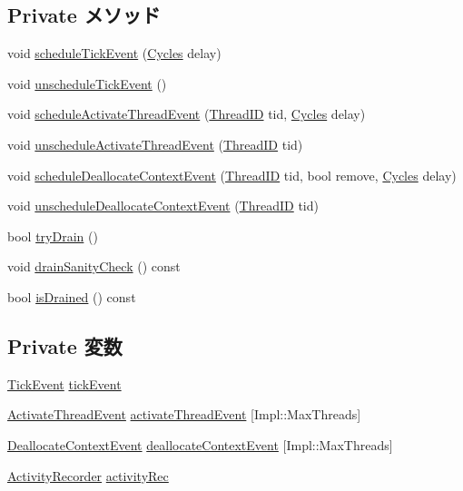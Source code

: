\subsection*{Private メソッド}
\begin{DoxyCompactItemize}
\item 
void \hyperlink{classFullO3CPU_a71eb9ea7b25032de341033111b946dfc}{scheduleTickEvent} (\hyperlink{classCycles}{Cycles} delay)
\item 
void \hyperlink{classFullO3CPU_ad819e7898bd94721d107a35fde764390}{unscheduleTickEvent} ()
\item 
void \hyperlink{classFullO3CPU_a20e502f38206c8cd988064e7bed53bb5}{scheduleActivateThreadEvent} (\hyperlink{base_2types_8hh_ab39b1a4f9dad884694c7a74ed69e6a6b}{ThreadID} tid, \hyperlink{classCycles}{Cycles} delay)
\item 
void \hyperlink{classFullO3CPU_ae0bacbe9552a4b3a03f2748d2d58b3a2}{unscheduleActivateThreadEvent} (\hyperlink{base_2types_8hh_ab39b1a4f9dad884694c7a74ed69e6a6b}{ThreadID} tid)
\item 
void \hyperlink{classFullO3CPU_a8c575b3dcfc822888003b64457ac9755}{scheduleDeallocateContextEvent} (\hyperlink{base_2types_8hh_ab39b1a4f9dad884694c7a74ed69e6a6b}{ThreadID} tid, bool remove, \hyperlink{classCycles}{Cycles} delay)
\item 
void \hyperlink{classFullO3CPU_adce69706fd17d1dca824e60ab0100e8b}{unscheduleDeallocateContextEvent} (\hyperlink{base_2types_8hh_ab39b1a4f9dad884694c7a74ed69e6a6b}{ThreadID} tid)
\item 
bool \hyperlink{classFullO3CPU_a250ca18dfc0316e340eaa2ec45d73c3e}{tryDrain} ()
\item 
void \hyperlink{classFullO3CPU_a0240eb42fa57fe5d3788093f62b77347}{drainSanityCheck} () const 
\item 
bool \hyperlink{classFullO3CPU_adf5473c18a3d7c1e88c4a2072bce5526}{isDrained} () const 
\end{DoxyCompactItemize}
\subsection*{Private 変数}
\begin{DoxyCompactItemize}
\item 
\hyperlink{classFullO3CPU_1_1TickEvent}{TickEvent} \hyperlink{classFullO3CPU_aa36b8e894416f0ec98f701ab08f2ac22}{tickEvent}
\item 
\hyperlink{classFullO3CPU_1_1ActivateThreadEvent}{ActivateThreadEvent} \hyperlink{classFullO3CPU_a2cc2815b59781367286d6a31fc45e9d3}{activateThreadEvent} \mbox{[}Impl::MaxThreads\mbox{]}
\item 
\hyperlink{classFullO3CPU_1_1DeallocateContextEvent}{DeallocateContextEvent} \hyperlink{classFullO3CPU_aaf8ffd47de062d6900cb500a3caccdb5}{deallocateContextEvent} \mbox{[}Impl::MaxThreads\mbox{]}
\item 
\hyperlink{classActivityRecorder}{ActivityRecorder} \hyperlink{classFullO3CPU_ae5ad3ebe67382e7fbc7fddcf48ae9c6c}{activityRec}
\end{DoxyCompactItemize}
